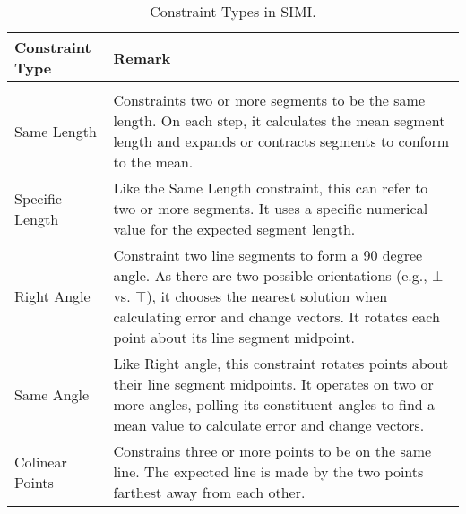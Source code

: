 \begin{table}
\centering
\begin{tabular}{l | p{12cm}}
\textbf{Constraint Type} &\textbf{Remark} \\
\hline
\\

Same Length &

Constraints two or more segments to be the same length. On each step,
it calculates the mean segment length and expands or contracts
segments to conform to the mean.

\\

Specific Length &

Like the Same Length constraint, this can refer to two or more
segments. It uses a specific numerical value for the expected segment
length.

\\

Right Angle &

Constraint two line segments to form a 90 degree angle. As there are
two possible orientations (e.g., $\bot$ vs. $\top$), it chooses the
nearest solution when calculating error and change vectors. It rotates
each point about its line segment midpoint.

\\

Same Angle &

Like Right angle, this constraint rotates points about their line
segment midpoints. It operates on two or more angles, polling its
constituent angles to find a mean value to calculate error and change
vectors.

\\

Colinear Points &

Constrains three or more points to be on the same line. The expected
line is made by the two points farthest away from each other.

\\ \hline
\end{tabular}
\caption[Constraint Types]{Constraint Types in SIMI.}
\label{tab:constraints}
\end{table}
